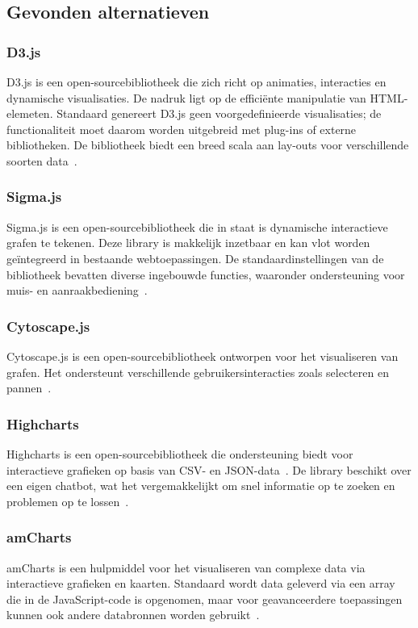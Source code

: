 \subsection{Gevonden alternatieven}
\subsubsection{D3.js}
D3.js is een open-sourcebibliotheek die zich richt op animaties, interacties en dynamische visualisaties. De nadruk ligt op de efficiënte manipulatie van HTML-eleme\-ten. Standaard genereert D3.js geen voorgedefinieerde visualisaties; de functionaliteit moet daarom worden uitgebreid met plug-ins of externe bibliotheken. De bibliotheek biedt een breed scala aan lay-outs voor verschillende soorten data~\autocite{Wang2015}.
\subsubsection{Sigma.js}
Sigma.js is een open-sourcebibliotheek die in staat is dynamische interactieve grafen te tekenen. Deze library is makkelijk inzetbaar en kan vlot worden geïntegreerd in bestaande webtoepassingen. De standaardinstellingen van de bibliotheek bevatten diverse ingebouwde functies, waaronder ondersteuning voor muis- en aanraakbediening~\autocite{Wang2015}.
\subsubsection{Cytoscape.js}
Cytoscape.js is een open-sourcebibliotheek ontworpen voor het visualiseren van grafen. Het ondersteunt verschillende gebruikersinteracties zoals selecteren en pannen~\autocite{Wang2015}.
\subsubsection{Highcharts}
Highcharts is een open-sourcebibliotheek die ondersteuning biedt voor interactieve grafieken op basis van CSV- en JSON-data~\autocite{Vucetic2023}. De library beschikt over een eigen chatbot, wat het vergemakkelijkt om snel informatie op te zoeken en problemen op te lossen~\autocite{Highcharts2025}.
\subsubsection{amCharts}
amCharts is een hulpmiddel voor het visualiseren van complexe data via interactieve grafieken en kaarten. Standaard wordt data geleverd via een array die in de JavaScript-code is opgenomen, maar voor geavanceerdere toepassingen kunnen ook andere databronnen worden gebruikt~\autocite{Chandra2022}.
